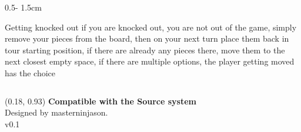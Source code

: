 \documentclass{uioposter}
\begin{document}
\begin{frame}
\begin{columns}[onlytextwidth]
\begin{column}{0.5\textwidth - 1.5cm}
    \begin{block}{Getting knocked out}
        if you are knocked out, you are not out of the game, simply remove your pieces from the board, then on your next turn place them back in tour starting position, if there are already any pieces there, move them to the next closest empty space, if there are multiple options, the player getting moved has the choice
    \end{block}


\end{column}


\end{columns}


\begin{textblock}{0.5}(0.18, 0.93)
    \color{white}
    \sffamily
    \textbf{Compatible with the Source system}
    \\
    Designed by masterninjason.
    \\
    v0.1
\end{textblock}


\end{frame}
\end{document}
